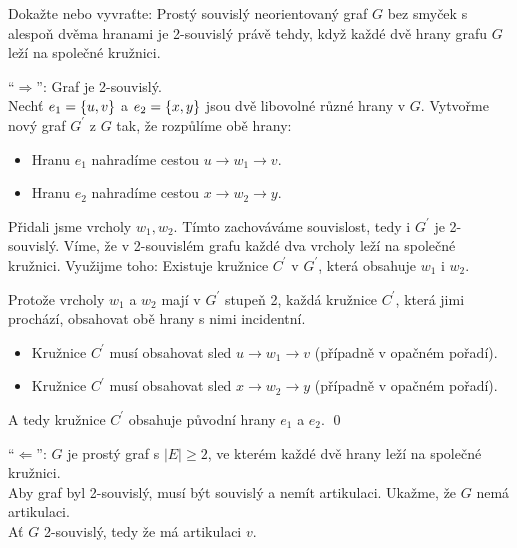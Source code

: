 \documentclass[11pt,a4paper]{article}
\begin{document}
\begin{exercise}
Dokažte nebo vyvraťte: Prostý souvislý neorientovaný graf $G$ bez smyček s alespoň dvěma hranami je 2-souvislý právě 
tehdy, když každé dvě hrany grafu $G$ leží na společné kružnici.
\end{exercise}
\begin{solution}
\titlebreak

\enquote{$\Rightarrow$}: Graf je 2-souvislý. \\
Nechť $e_1 = \left\lbrace u,v \right\rbrace$ a $e_2 = \left\lbrace x,y \right\rbrace$ jsou dvě libovolné různé hrany v $G$. Vytvořme nový graf $G^\prime$ z $G$ tak, 
že rozpůlíme obě hrany:
\vspace{-1em}
\begin{itemize}[noitemsep]
    \item Hranu $e_1$ nahradíme cestou $u \rightarrow w_1 \rightarrow v$.
    \item Hranu $e_2$ nahradíme cestou $x \rightarrow w_2 \rightarrow y$.
\end{itemize}
\vspace{-1em}
Přidali jsme vrcholy $w_1, w_2$. Tímto zachováváme souvislost, tedy i $G^\prime$ je 2-souvislý. Víme, že v 2-souvislém 
grafu každé dva vrcholy leží na společné kružnici. Využijme toho: Existuje kružnice $C^\prime$ v $G^\prime$, která 
obsahuje $w_1$ i $w_2$.

Protože vrcholy $w_1$ a $w_2$ mají v $G^\prime$ stupeň 2, každá kružnice $C^\prime$, která jimi prochází,  
obsahovat obě hrany s nimi incidentní.
\vspace{-1em}
\begin{itemize}[noitemsep]
    \item Kružnice $C^\prime$ musí obsahovat sled $u \rightarrow w_1 \rightarrow v$ (případně v opačném pořadí).
    \item Kružnice $C^\prime$ musí obsahovat sled $x \rightarrow w_2 \rightarrow y$ (případně v opačném pořadí).
\end{itemize}
\vspace{-1em}
A tedy kružnice $C^\prime$ obsahuje původní hrany $e_1$ a $e_2$.
\hspace{\fill}\qed

\enquote{$\Leftarrow$}: $G$ je prostý graf s $|E| \geq 2$, ve kterém každé dvě hrany leží na společné kružnici.\\
Aby graf byl 2-souvislý, musí být souvislý a nemít artikulaci. Ukažme, že $G$ nemá artikulaci. \\ 
 Ať $G$  2-souvislý, tedy že má artikulaci $v$.


\end{solution}
\end{document}
